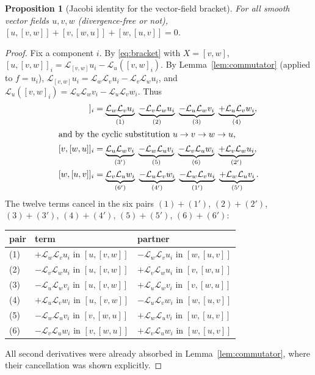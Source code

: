 \documentclass[11pt]{article}
\newtheorem{proposition}[theorem]{Proposition}
\theoremstyle{definition}
\newcommand{\Lie}{\mathcal{L}}
\begin{document}
\begin{proposition}[Jacobi identity for the vector-field bracket]\label{prop:vfjacobi}
For all smooth vector fields $u,v,w$ (divergence-free or not),
$[u,[v,w]]+[v,[w,u]]+[w,[u,v]]=0$.
\end{proposition}
\begin{proof}
Fix a component $i$. By \eqref{eq:bracket} with $X=[v,w]$,
$[u,[v,w]]_i=\Lie_{[v,w]}u_i-\Lie_u([v,w]_i)$. By Lemma~\ref{lem:commutator} (applied to $f=u_i$),
$\Lie_{[v,w]}u_i=\Lie_w\Lie_vu_i-\Lie_v\Lie_wu_i$, and $\Lie_u([v,w]_i)=\Lie_u\Lie_wv_i-\Lie_u\Lie_vw_i$. Thus
\begin{align*}
[u,[v,w]]_i&=\underbrace{\Lie_w\Lie_vu_i}_{(1)}\ \underbrace{-\Lie_v\Lie_wu_i}_{(2)}\ \underbrace{-\Lie_u\Lie_wv_i}_{(3)}\ \underbrace{+\Lie_u\Lie_vw_i}_{(4)},\\
\intertext{and by the cyclic substitution $u\to v\to w\to u$,}
[v,[w,u]]_i&=\underbrace{\Lie_u\Lie_wv_i}_{(3')}\ \underbrace{-\Lie_w\Lie_uv_i}_{(5)}\ \underbrace{-\Lie_v\Lie_uw_i}_{(6)}\ \underbrace{+\Lie_v\Lie_wu_i}_{(2')},\\
[w,[u,v]]_i&=\underbrace{\Lie_v\Lie_uw_i}_{(6')}\ \underbrace{-\Lie_u\Lie_vw_i}_{(4')}\ \underbrace{-\Lie_w\Lie_vu_i}_{(1')}\ \underbrace{+\Lie_w\Lie_uv_i}_{(5')}.
\end{align*}
The twelve terms cancel in the six pairs $(1)+(1')$, $(2)+(2')$, $(3)+(3')$, $(4)+(4')$,
$(5)+(5')$, $(6)+(6')$:
\begin{center}
\begin{tabular}{lll}\toprule
pair & term & partner\\\midrule
(1) & $+\Lie_w\Lie_vu_i$ in $[u,[v,w]]$ & $-\Lie_w\Lie_vu_i$ in $[w,[u,v]]$\\
(2) & $-\Lie_v\Lie_wu_i$ in $[u,[v,w]]$ & $+\Lie_v\Lie_wu_i$ in $[v,[w,u]]$\\
(3) & $-\Lie_u\Lie_wv_i$ in $[u,[v,w]]$ & $+\Lie_u\Lie_wv_i$ in $[v,[w,u]]$\\
(4) & $+\Lie_u\Lie_vw_i$ in $[u,[v,w]]$ & $-\Lie_u\Lie_vw_i$ in $[w,[u,v]]$\\
(5) & $-\Lie_w\Lie_uv_i$ in $[v,[w,u]]$ & $+\Lie_w\Lie_uv_i$ in $[w,[u,v]]$\\
(6) & $-\Lie_v\Lie_uw_i$ in $[v,[w,u]]$ & $+\Lie_v\Lie_uw_i$ in $[w,[u,v]]$\\\bottomrule
\end{tabular}
\end{center}
All second derivatives were already absorbed in Lemma~\ref{lem:commutator}, where their
cancellation was shown explicitly.
\end{proof}
\end{document}
